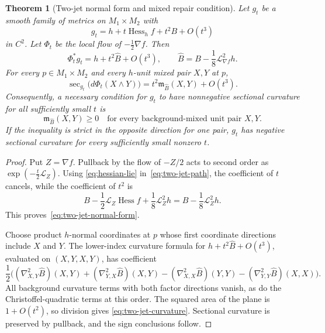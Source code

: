\documentclass[11pt]{amsart}
\newtheorem{theorem}{Theorem}[section]
\theoremstyle{definition}
\theoremstyle{remark}
\DeclareMathOperator{\Hess}{Hess}
\DeclareMathOperator{\secop}{sec}
\begin{document}
\begin{theorem}[Two-jet normal form and mixed repair condition]
\label{thm:two-jet}
Let $g_t$ be a smooth family of metrics on $M_1\times M_2$ with
\begin{equation}\label{eq:two-jet-path}
 g_t=h+t\Hess_h f+t^2B+O(t^3)
\end{equation}
in $C^2$.  Let $\Phi_t$ be the local flow of
$-\frac12\nabla f$.  Then
\begin{equation}\label{eq:two-jet-normal-form}
 \Phi_t^*g_t=h+t^2\widehat B+O(t^3),
 \qquad
 \widehat B=B-\frac18\mathcal L_{\nabla f}^2h.
\end{equation}
For every $p\in M_1\times M_2$ and every $h$-unit mixed pair
$X,Y$ at $p$,
\begin{equation}\label{eq:two-jet-curvature}
 \secop_{g_t}\bigl(d\Phi_t(X\wedge Y)\bigr)
 =t^2\mathfrak m_{\widehat B}(X,Y)+O(t^3).
\end{equation}
Consequently, a necessary condition for $g_t$ to have nonnegative
sectional curvature for all sufficiently small $t$ is
\begin{equation}\label{eq:two-jet-necessary}
 \mathfrak m_{\widehat B}(X,Y)\geq0
 \quad\text{for every background-mixed unit pair }X,Y.
\end{equation}
If the inequality is strict in the opposite direction for one pair,
$g_t$ has negative sectional curvature for every sufficiently small
nonzero $t$.
\end{theorem}

\begin{proof}
Put $Z=\nabla f$.  Pullback by the flow of $-Z/2$ acts to second order
as $\exp(-\frac t2\mathcal L_Z)$.  Using
\eqref{eq:hessian-lie} in~\eqref{eq:two-jet-path}, the coefficient of
$t$ cancels, while the coefficient of $t^2$ is
\[
 B-\frac12\mathcal L_Z\Hess f
   +\frac18\mathcal L_Z^2h
 =B-\frac18\mathcal L_Z^2h.
\]
This proves~\eqref{eq:two-jet-normal-form}.

Choose product $h$-normal coordinates at $p$ whose first coordinate
directions include $X$ and $Y$.  The lower-index curvature formula for
$h+t^2\widehat B+O(t^3)$, evaluated on $(X,Y,X,Y)$, has coefficient
\[
 \frac12\bigl(
  (\nabla^2_{X,Y}\widehat B)(X,Y)
 +(\nabla^2_{Y,X}\widehat B)(X,Y)
 -(\nabla^2_{X,X}\widehat B)(Y,Y)
 -(\nabla^2_{Y,Y}\widehat B)(X,X)
 \bigr).
\]
All background curvature terms with both factor directions vanish,
as do the Christoffel-quadratic terms at this order.  The squared area
of the plane is $1+O(t^2)$, so division gives
\eqref{eq:two-jet-curvature}.  Sectional curvature is preserved by
pullback, and the sign conclusions follow.
\end{proof}
\end{document}
